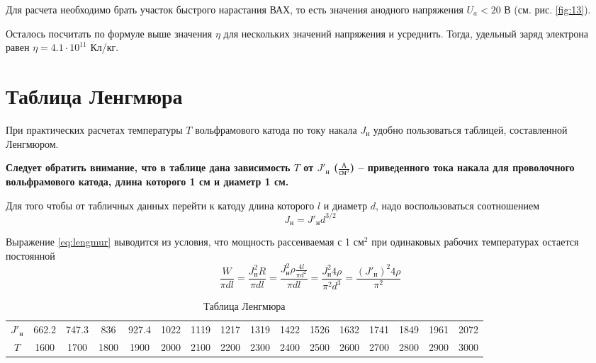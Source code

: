 Для расчета необходимо брать участок быстрого нарастания ВАХ, то есть значения
анодного напряжения $U_a < 20$ В (см. рис. \ref{fig:13}). 

Осталось посчитать по формуле выше значения $\eta$ для нескольких значений
напряжения и усреднить. 
Тогда, удельный заряд электрона равен $\eta=4.1 \cdot 10^{11}$ Кл/кг.


\appendix

\section{Таблица Ленгмюра}%
\label{sub:tablitsa_lengmiura}
При практических расчетах температуры $T$ вольфрамового катода по току накала
$J_{\text{н}}$  удобно пользоваться таблицей, составленной Ленгмюром.

\textbf{
    Следует обратить внимание, что в таблице дана зависимость  $T$ от
    $J'_{\text{н}}$  ($\frac{\text{А}}{\text{см}^3}$) -- приведенного тока
    накала для проволочного вольфрамового катода, длина которого 1 см и диаметр
    1 см. 
} 

Для того чтобы от табличных данных перейти к катоду длина которого $l$ и
диаметр $d$, надо воспользоваться соотношением
\begin{equation}
    \label{eq:lengmur}
    J_{\text{н}} = J'_{\text{н}} d^{3 / 2}
\end{equation}

Выражение \eqref{eq:lengmur} выводится из условия, что мощность рассеиваемая с
1 $\text{см}^2$ при одинаковых рабочих температурах остается постоянной
 \begin{equation}
     \frac{W}{\pi d l} = \frac{J_{\text{н}}^2 R}{\pi d l} = \frac{J^2_{\text{н}}
     \rho \frac{4l}{\pi d^2}}{\pi d l} = \frac{J^2_{\text{н}} 4 \rho}{\pi^2
 d^3} = \frac{(J'_{\text{н}})^2 4 \rho}{\pi^2}
\end{equation}

\begin{table}[h]
    \centering
    \caption{Таблица Ленгмюра}
    \label{tab:lengmur}
    \footnotesize
    \begin{tabular}{||c||c|c|c|c|c|c|c|c|c|c|c|c|c|c|c|}
        \hline
        $J'_{\text{н}}$ & 662.2 & 747.3 & 836   & 927.4 & 1022  & 1119  & 1217  & 1319  & 1422  &
        1526  & 1632  & 1741  & 1849  & 1961  & 2072   \\

        $T$ & 1600 & 1700 & 1800 & 1900 & 2000 & 2100 & 2200 & 2300 & 2400 & 2500 &
        2600 & 2700 & 2800 & 2900 & 3000 \\
        \hline
    \end{tabular}
\end{table}




